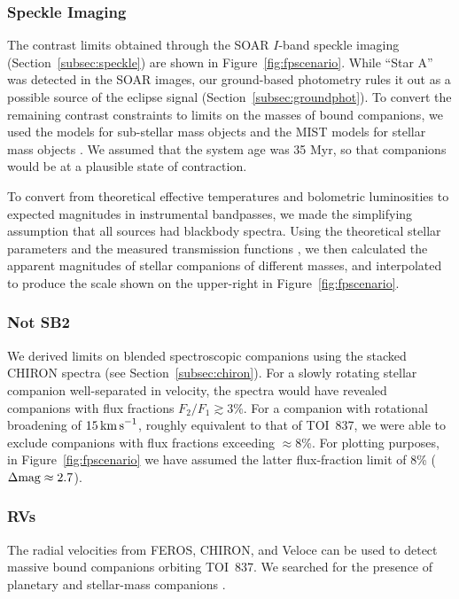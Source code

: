 \documentclass[12pt,twocolumn,tighten]{aastex63}
\newcommand{\tn}{TOI~837} %
\begin{document}
\subsubsection{Speckle Imaging}
\label{subsec:speckleconstraint}
The contrast limits obtained through the SOAR $I$-band speckle imaging
(Section~\ref{subsec:speckle}) are shown in
Figure~\ref{fig:fpscenario}.  While ``Star A'' was detected in the
SOAR images, our ground-based photometry rules it out as a possible
source of the eclipse signal (Section~\ref{subsec:groundphot}).  To
convert the remaining contrast constraints to limits on the masses of
bound companions, we used the \citet{baraffe_evolutionary_2003} models
for sub-stellar mass objects and the MIST models for stellar mass
objects
\citep{paxton_modules_2011,paxton_modules_2013,paxton_modules_2015,dotter_mesa_2016,choi_mesa_2016}.
We assumed that the system age was 35 Myr, so that companions would be
at a plausible state of contraction.

To convert from theoretical effective temperatures and bolometric
luminosities to expected magnitudes in instrumental bandpasses, we
made the simplifying assumption that all sources had blackbody
spectra.  Using the theoretical stellar parameters and the measured
transmission functions \citep{tokovinin_ten_2018}, we then calculated
the apparent magnitudes of stellar companions of different masses, and
interpolated to produce the scale shown on the upper-right in
Figure~\ref{fig:fpscenario}.

\subsubsection{Not SB2}
We derived limits on blended spectroscopic companions using the
stacked CHIRON spectra (see Section~\ref{subsec:chiron}).  For a
slowly rotating stellar companion well-separated in velocity, the
spectra would have revealed companions with flux fractions $F_2/F_1
\gtrsim 3\%$.  For a companion with rotational broadening of $15\,{\rm
km\,s}^{-1}$, roughly equivalent to that of \tn, we were able to
exclude companions with flux fractions exceeding $\approx$8\%.  For
plotting purposes, in Figure~\ref{fig:fpscenario} we have assumed the
latter flux-fraction limit of 8\% ($\Delta {\rm mag} \approx 2.7$).


\subsubsection{RVs}
The radial velocities from FEROS, CHIRON, and Veloce can be used to
detect massive bound companions orbiting \tn.  We searched for the
presence of planetary and stellar-mass companions .
\end{document}
